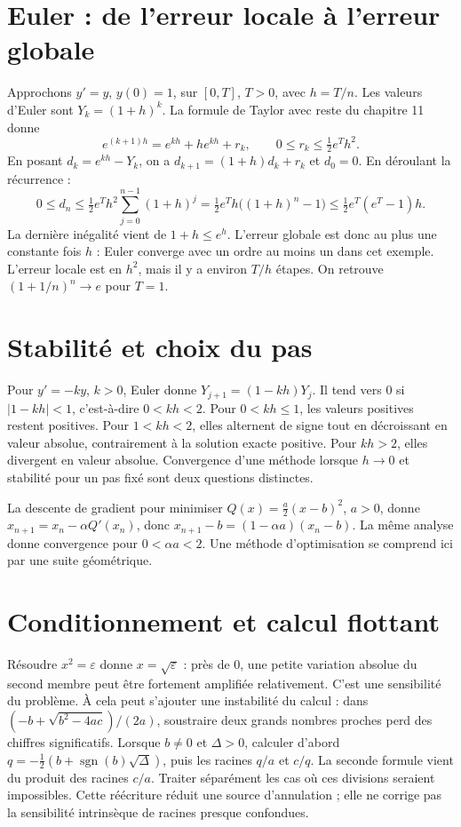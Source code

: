 \documentclass[../cours_1re.tex]{subfiles}
\begin{document}
\section{Euler : de l'erreur locale à l'erreur globale}
Approchons $y'=y$, $y(0)=1$, sur $[0,T]$, $T>0$, avec $h=T/n$.
Les valeurs d'Euler sont $Y_k=(1+h)^k$.
La formule de Taylor avec reste du chapitre 11 donne
\[
e^{(k+1)h}=e^{kh}+he^{kh}+r_k,\qquad
0\le r_k\le\tfrac12e^Th^2.
\]
En posant $d_k=e^{kh}-Y_k$, on a
$d_{k+1}=(1+h)d_k+r_k$ et $d_0=0$.
En déroulant la récurrence :
\[
0\le d_n\le\tfrac12e^Th^2\sum_{j=0}^{n-1}(1+h)^j
=\tfrac12e^Th\big((1+h)^n-1\big)
\le\tfrac12e^T(e^T-1)h.
\]
La dernière inégalité vient de $1+h\le e^h$.
L'erreur globale est donc au plus une constante fois $h$ :
Euler converge avec un ordre au moins un dans cet exemple.
L'erreur locale est en $h^2$, mais il y a environ $T/h$ étapes.
On retrouve $(1+1/n)^n\to e$ pour $T=1$.

\section{Stabilité et choix du pas}
Pour $y'=-ky$, $k>0$, Euler donne $Y_{j+1}=(1-kh)Y_j$.
Il tend vers $0$ si $|1-kh|<1$, c'est-à-dire $0<kh<2$.
Pour $0<kh\le1$, les valeurs positives restent positives.
Pour $1<kh<2$, elles alternent de signe tout en décroissant en valeur absolue,
contrairement à la solution exacte positive. Pour $kh>2$, elles divergent
en valeur absolue. Convergence d'une méthode lorsque $h\to0$ et stabilité
pour un pas fixé sont deux questions distinctes.

La descente de gradient pour minimiser
$Q(x)=\frac a2(x-b)^2$, $a>0$, donne
$x_{n+1}=x_n-\alpha Q'(x_n)$, donc
$x_{n+1}-b=(1-\alpha a)(x_n-b)$.
La même analyse donne convergence pour $0<\alpha a<2$.
Une méthode d'optimisation se comprend ici par une suite géométrique.

\section{Conditionnement et calcul flottant}
Résoudre $x^2=\varepsilon$ donne $x=\sqrt\varepsilon$ :
près de $0$, une petite variation absolue du second membre peut être
fortement amplifiée relativement. C'est une sensibilité du problème.
À cela peut s'ajouter une instabilité du calcul : dans
$(-b+\sqrt{b^2-4ac})/(2a)$, soustraire deux grands nombres proches perd
des chiffres significatifs.
Lorsque $b\ne0$ et $\Delta>0$, calculer d'abord
$q=-\frac12(b+\operatorname{sgn}(b)\sqrt\Delta)$, puis les racines
$q/a$ et $c/q$. La seconde formule vient du produit des racines $c/a$.
Traiter séparément les cas où ces divisions seraient impossibles.
Cette réécriture réduit une source d'annulation ; elle ne corrige pas
la sensibilité intrinsèque de racines presque confondues.
\end{document}
